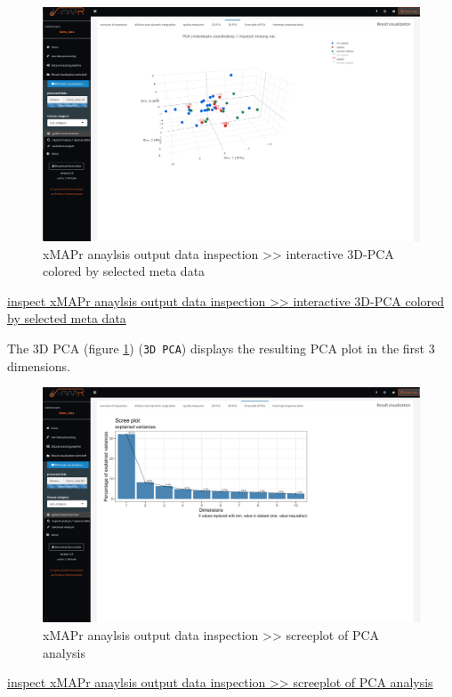 \documentclass[
]{book}
\begin{document}
\begin{figure}
\includegraphics[width=50.5in]{figures/global_result_overview_PCA3D} \caption{xMAPr anaylsis output data inspection >> interactive 3D-PCA colored by selected meta data}\label{fig:PCA3D}
\end{figure}

\href{figures/global_result_overview_PCA3D.png}{inspect xMAPr anaylsis output data inspection \textgreater\textgreater{} interactive 3D-PCA colored by selected meta data}

The 3D PCA (figure \ref{fig:PCA3D}) (\texttt{3D\ PCA}) displays the resulting PCA plot in the first 3 dimensions.

\begin{figure}
\includegraphics[width=50.5in]{figures/global_result_overview_PCA_scree} \caption{xMAPr anaylsis output data inspection >> screeplot of PCA analysis}\label{fig:PCAscreeplot}
\end{figure}

\href{figures/global_result_overview_PCA_scree.png}{inspect xMAPr anaylsis output data inspection \textgreater\textgreater{} screeplot of PCA analysis}
\end{document}

